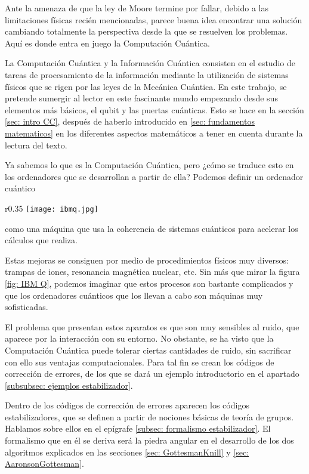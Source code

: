\documentclass[11pt,a4paper,twoside,pdf]{article}
\numberwithin{equation}{section}
\begin{document}
Ante la amenaza de que la ley de Moore termine por fallar, debido a las limitaciones físicas recién mencionadas, parece buena idea encontrar una solución cambiando totalmente la perspectiva desde la que se resuelven los problemas. Aquí es donde entra en juego la Computación Cuántica.

La Computación Cuántica y la Información Cuántica \cite{NielsenChuang} consisten en el estudio de tareas de procesamiento de la información mediante la utilización de sistemas físicos que se rigen por las leyes de la Mecánica Cuántica. En este trabajo, se pretende sumergir al lector en este fascinante mundo empezando desde sus elementos más básicos, el qubit y las puertas cuánticas. Esto se hace en la sección \ref{sec: intro CC}, después de haberlo introducido en \ref{sec: fundamentos matematicos} en los diferentes aspectos matemáticos a tener en cuenta durante la lectura del texto.

Ya sabemos lo que es la Computación Cuántica, pero ¿cómo se traduce esto en los ordenadores que se desarrollan a partir de ella? Podemos definir un  ordenador cuántico 
	\begin{wrapfigure}[16]{r}{0.35\columnwidth}
		\centering
		\texttt{[image: ibmq.jpg]}	
		\captionsetup{justification=centering}	
		\caption{ Ordenador Cuántico IBM Q}
		\label{fig: IBM Q}
	\end{wrapfigure}
como una máquina que usa la coherencia de sistemas cuánticos para acelerar los cálculos que realiza.

Estas mejoras se consiguen por medio de procedimientos físicos muy diversos: trampas de iones, resonancia magnética nuclear, etc. Sin más que mirar la figura \ref{fig: IBM Q}, podemos imaginar que estos procesos son bastante complicados y que los ordenadores cuánticos que los llevan a cabo son máquinas muy sofisticadas.

El problema que presentan estos aparatos es que son muy sensibles al ruido, que aparece por la interacción con su entorno. No obstante, se ha visto que la Computación Cuántica puede tolerar ciertas cantidades de ruido, sin sacrificar con ello sus ventajas computacionales. Para tal fin se crean los códigos de corrección de errores, de los que se dará un ejemplo introductorio en el apartado \ref{subsubsec: ejemplos estabilizador}.

\newpage
Dentro de los códigos de corrección de errores aparecen los códigos estabilizadores, que se definen a partir de nociones básicas de teoría de grupos. Hablamos sobre ellos en el epígrafe \ref{subsec: formalismo estabilizador}. El formalismo que en él se deriva será la piedra angular en el desarrollo de los dos algoritmos explicados en las secciones \ref{sec: GottesmanKnill} y \ref{sec: AaronsonGottesman}.
\end{document}
